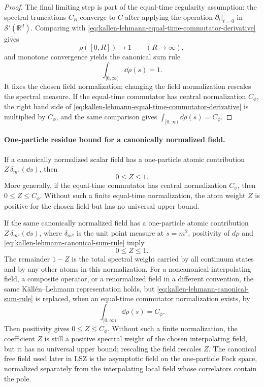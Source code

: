 \begin{proof}
The final limiting step is part of the equal-time regularity assumption: the
spectral truncations \(C_R\) converge to \(C\) after applying the operation
\(\partial_t|_{t=0}\) in \(\mathcal S'(\mathbb R^d)\).  Comparing with
\eqref{eq:kallen-lehmann-equal-time-commutator-derivative} gives
\[
  \rho([0,R])\longrightarrow 1
  \qquad (R\to\infty),
\]
and monotone convergence yields the canonical sum rule
\begin{equation}
  \int_{[0,\infty)}\dd\rho(s)=1.
  \label{eq:kallen-lehmann-canonical-sum-rule}
\end{equation}
It fixes the chosen field normalization; changing the field normalization
rescales the spectral measure.
If the equal-time commutator has central normalization \(C_\phi\), the right
hand side of
\eqref{eq:kallen-lehmann-equal-time-commutator-derivative} is multiplied by
\(C_\phi\), and the same comparison gives
\(\int_{[0,\infty)}\dd\rho(s)=C_\phi\).
\end{proof}

\paragraph{One-particle residue bound for a canonically normalized field.}
If a canonically normalized scalar field has a one-particle atomic
contribution \(Z\,\delta_{m^2}(\dd s)\), then
\[
  0\le Z\le1 .
\]
More generally, if the equal-time commutator has central normalization
\(C_\phi\), then \(0\le Z\le C_\phi\).  Without such a finite equal-time
normalization, the atom weight \(Z\) is positive for the chosen field but has
no universal upper bound.

If the same canonically normalized field has a one-particle atomic contribution
\(Z\,\delta_{m^2}(\dd s)\), where \(\delta_{m^2}\) is the unit point measure at
\(s=m^2\), positivity of \(d\rho\) and
\eqref{eq:kallen-lehmann-canonical-sum-rule} imply
\[
  0\le Z\le1.
\]
The remainder \(1-Z\) is the total spectral weight carried by all continuum
states and by any other atoms in this normalization.  For a noncanonical
interpolating field, a composite operator, or a renormalized field in a
different convention, the same K\"all\'en--Lehmann representation holds, but
\eqref{eq:kallen-lehmann-canonical-sum-rule} is replaced, when an equal-time
commutator normalization exists, by
\[
  \int_{[0,\infty)}\dd\rho(s)=C_\phi .
\]
Then positivity gives \(0\le Z\le C_\phi\).  Without such a finite
normalization, the coefficient \(Z\) is still a positive spectral weight of the
chosen interpolating field, but it has no universal upper bound; rescaling the
field rescales \(Z\).  The canonical free field used later in LSZ is the
asymptotic field on the one-particle Fock space, normalized separately from the
interpolating local field whose correlators contain the pole.

